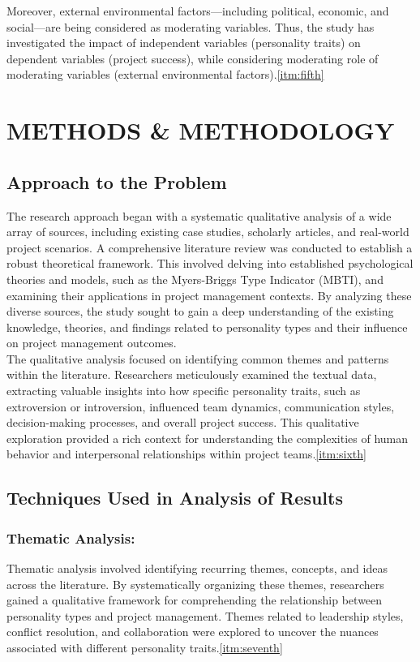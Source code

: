 \documentclass[a4Paper]{article}
\begin{document}
Moreover, external environmental factors—including political, economic, and social—are being considered as moderating variables. Thus, the study has investigated the impact of independent variables (personality traits) on dependent variables (project success), while considering moderating role of moderating variables (external environmental factors).\ref{itm:fifth}

\pagebreak


\section{METHODS \& METHODOLOGY}

\subsection{Approach to the Problem}
The research approach began with a systematic qualitative analysis of a wide array of sources, including existing case studies, scholarly articles, and real-world project scenarios. A comprehensive literature review was conducted to establish a robust theoretical framework. This involved delving into established psychological theories and models, such as the Myers-Briggs Type Indicator (MBTI), and examining their applications in project management contexts. By analyzing these diverse sources, the study sought to gain a deep understanding of the existing knowledge, theories, and findings related to personality types and their influence on project management outcomes.\\

The qualitative analysis focused on identifying common themes and patterns within the literature. Researchers meticulously examined the textual data, extracting valuable insights into how specific personality traits, such as extroversion or introversion, influenced team dynamics, communication styles, decision-making processes, and overall project success. This qualitative exploration provided a rich context for understanding the complexities of human behavior and interpersonal relationships within project teams.\ref{itm:sixth}

\subsection{Techniques Used in Analysis of Results}

\subsubsection{Thematic Analysis: } Thematic analysis involved identifying recurring themes, concepts, and ideas across the literature. By systematically organizing these themes, researchers gained a qualitative framework for comprehending the relationship between personality types and project management. Themes related to leadership styles, conflict resolution, and collaboration were explored to uncover the nuances associated with different personality traits.\ref{itm:seventh}
\end{document}
